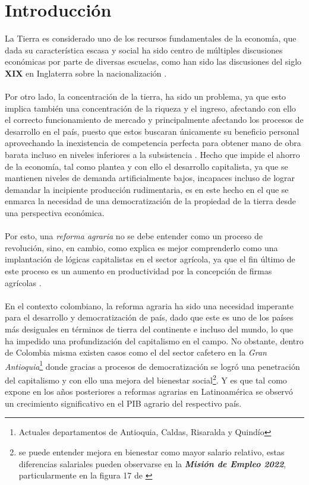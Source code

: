 \documentclass[11pt]{article}
\begin{document}
{\section{Introducción}
\begin{flushleft}
    La Tierra es considerado uno de los recursos fundamentales de la economía, que dada su característica escasa 
    y social ha sido centro de múltiples discusiones económicas por parte de diversas escuelas,
    como han sido las discusiones del siglo \textbf{XIX} en Inglaterra sobre la nacionalización \citep{Ramos2007}.
    \\~\\
    Por otro lado, la concentración de la tierra, ha sido un problema, ya que esto implica también una concentración de la riqueza y el ingreso,
    afectando con ello el correcto funcionamiento de mercado y principalmente afectando los procesos de desarrollo en el país,
    puesto que estos buscaran únicamente su beneficio personal aprovechando la inexistencia de competencia perfecta para obtener mano de obra barata incluso en niveles inferiores a la subsistencia \citep{Cardenas1954}.
    Hecho que impide el ahorro de la economía, tal como plantea \citet{Say} y con ello el desarrollo capitalista, ya que se mantienen niveles de demanda artificialmente bajos,
    incapaces incluso de lograr demandar la incipiente producción rudimentaria, es en este hecho en el que se enmarca la necesidad de una democratización de la propiedad de la tierra desde una perspectiva económica.
    \\~\\
    Por esto, una \textit{reforma agraria} no se debe entender como un proceso de revolución, sino, en cambio, como explica \citet{lenin_1971}
    es mejor comprenderlo como una implantación de lógicas capitalistas en el sector agrícola, ya que el fin último de este proceso es un aumento 
    en productividad por la concepción de firmas agrícolas \citep{hamuy_1996}.
    \\~\\
    En el contexto colombiano, la reforma agraria ha sido una necesidad imperante para el desarrollo y democratización de país,
    dado que este es uno de los países más desiguales en términos de tierra del continente e incluso del mundo,
    lo que ha impedido una profundización del capitalismo en el campo. No obstante, 
    dentro de Colombia misma existen casos como el del sector cafetero en la \textit{Gran Antioquia}\footnote{Actuales departamentos de Antioquia, Caldas, Risaralda y Quindío} donde gracias a procesos de democratización se logró
    una penetración del capitalismo y con ello una mejora del bienestar social\footnote{se puede entender mejora en bienestar como mayor salario relativo, estas diferencias salariales pueden observarse en la \textit{\textbf{Misión de Empleo 2022}},
    particularmente en la figura 17 de \citep{AMM2021}}\citep{Vergara2011}. Y es que tal como expone \citet{Ocampo2001} en los años posteriores a reformas agrarias en Latinoamérica se observó un crecimiento significativo en el PIB agrario del respectivo país.\end{flushleft}

}
\end{document}
